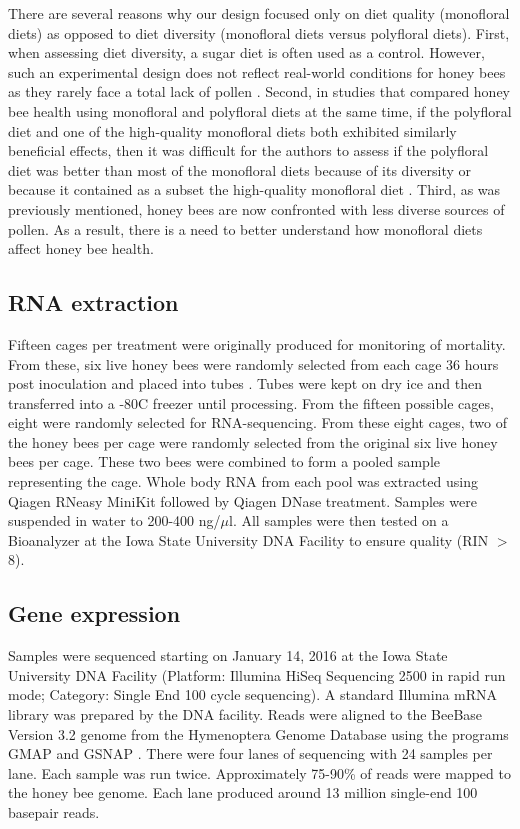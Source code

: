 \documentclass{bmcart}
\begin{document}
\begin{linenumbers}
\begin{doublespacing}
There are several reasons why our design focused only on diet quality (monofloral diets) as opposed to diet diversity (monofloral diets versus polyfloral diets). First, when assessing diet diversity, a sugar diet is often used as a control. However, such an experimental design does not reflect real-world conditions for honey bees as they rarely face a total lack of pollen \cite{DiPasquale}. Second, in studies that compared honey bee health using monofloral and polyfloral diets at the same time, if the polyfloral diet and one of the high-quality monofloral diets both exhibited similarly beneficial effects, then it was difficult for the authors to assess if the polyfloral diet was better than most of the monofloral diets because of its diversity or because it contained as a subset the high-quality monofloral diet \cite{DiPasquale}. Third, as was previously mentioned, honey bees are now confronted with less diverse sources of pollen. As a result, there is a need to better understand how monofloral diets affect honey bee health.

\subsection*{RNA extraction}

Fifteen cages per treatment were originally produced for monitoring of mortality. From these, six live honey bees were randomly selected from each cage 36 hours post inoculation and placed into tubes \cite{carrillo}. Tubes were kept on dry ice and then transferred into a -80C freezer until processing. From the fifteen possible cages, eight were randomly selected for RNA-sequencing. From these eight cages, two of the honey bees per cage were randomly selected from the original six live honey bees per cage. These two bees were combined to form a pooled sample representing the cage. Whole body RNA from each pool was extracted using Qiagen RNeasy MiniKit followed by Qiagen DNase treatment. Samples were suspended in water to 200-400 ng/$\mu$l. All samples were then tested on a Bioanalyzer at the Iowa State University DNA Facility to ensure quality (RIN $>$ 8).

\subsection*{Gene expression}

Samples were sequenced starting on January 14, 2016 at the Iowa State University DNA Facility (Platform: Illumina HiSeq Sequencing 2500 in rapid run mode; Category: Single End 100 cycle sequencing). A standard Illumina mRNA library was prepared by the DNA facility. Reads were aligned to the BeeBase Version 3.2 genome \cite{hbGenome} from the Hymenoptera Genome Database \cite{hymenopteraDB} using the programs GMAP and GSNAP \cite{gsnap}. There were four lanes of sequencing with 24 samples per lane. Each sample was run twice. Approximately 75-90\% of reads were mapped to the honey bee genome. Each lane produced around 13 million single-end 100 basepair reads.


\end{doublespacing}
\end{linenumbers}
\end{document}
